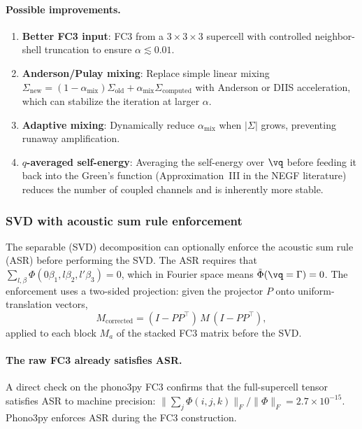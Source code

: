 \paragraph{Possible improvements.}
\begin{enumerate}
  \item \textbf{Better FC3 input}: FC3 from a $3\times 3\times 3$
    supercell with controlled neighbor-shell truncation to ensure
    $\alpha \lesssim 0.01$.
  \item \textbf{Anderson/Pulay mixing}: Replace simple linear mixing
    $\Sigma_\mathrm{new} = (1-\alpha_\mathrm{mix})\Sigma_\mathrm{old}
    + \alpha_\mathrm{mix}\Sigma_\mathrm{computed}$ with Anderson or
    DIIS acceleration, which can stabilize the iteration at larger
    $\alpha$.
  \item \textbf{Adaptive mixing}: Dynamically reduce
    $\alpha_\mathrm{mix}$ when $|\Sigma|$ grows, preventing runaway
    amplification.
  \item \textbf{$q$-averaged self-energy}: Averaging the self-energy
    over $\vq$ before feeding it back into the Green's function
    (Approximation~III in the NEGF literature) reduces the number of
    coupled channels and is inherently more stable.
\end{enumerate}


\subsubsection{SVD with acoustic sum rule enforcement}
\label{sssub:svd_asr}

The separable (SVD) decomposition can optionally enforce the acoustic
sum rule (ASR) before performing the SVD.  The ASR requires that
$\sum_{l,\beta} \Phi(0\beta_1, l\beta_2, l'\beta_3) = 0$, which in
Fourier space means $\tilde\Phi(\vq = \Gamma) = 0$.  The enforcement
uses a two-sided projection: given the projector $P$ onto
uniform-translation vectors,
\begin{equation}
  M_\mathrm{corrected} = (I - PP^\top)\,M\,(I - PP^\top),
\end{equation}
applied to each block $M_a$ of the stacked FC3 matrix before the SVD.

\paragraph{The raw FC3 already satisfies ASR.}
A direct check on the phono3py FC3 confirms that the full-supercell
tensor satisfies ASR to machine precision:
$\|\sum_j \Phi(i,j,k)\|_F / \|\Phi\|_F = 2.7 \times 10^{-15}$.
Phono3py enforces ASR during the FC3 construction.


